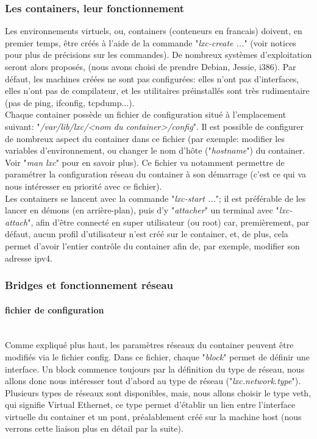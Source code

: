 
\subsubsection{Les containers, leur fonctionnement}

Les environnements virtuels, ou, containers (conteneurs en francais)  doivent, en premier temps, \^etre cr\'e\'es
\`a l'aide de la commande "\emph{lxc-create ...}" (voir notices pour plus de pr\'ecisions sur les commandes). De
nombreux syst\`emes d'exploitation seront alors propos\'es, (nous avons choisi de prendre Debian, Jessie,
i386). Par d\'efaut, les machines cr\'e\'ees ne sont pas configur\'ees: elles n'ont pas d'interfaces, elles 
n'ont pas de compilateur, et les utilitaires pr\'einstall\'es sont tr\`es rudimentaire 
(pas de ping, ifconfig, tcpdump...).\\

Chaque container poss\`ede un fichier de configuration situ\'e \`a l'emplacement suivant: "\emph{/var/lib/lxc/<nom 
du container>/config}". Il est possible de configurer de nombreux aspect du container dans ce fichier 
(par exemple: modifier les variables d'environnement, ou changer le nom d'h\^ote ("\emph{hostname}") du 
container. Voir "\emph{man lxc}" pour en savoir plus). Ce fichier va notamment permettre de param\'etrer la 
configuration r\'eseau du container \`a son d\'emarrage (c'est ce qui va nous int\'eresser en priorit\'e avec 
ce fichier).\\

Les containers se lancent avec la commande "\emph{lxc-start ...}"; il est pr\'ef\'erable de les lancer en d\'emons
(en arri\`ere-plan), puis d'y "\emph{attacher}" un terminal avec "\emph{lxc-attach}", afin d'\^etre connect\'e
en super utilisateur (ou root) car, premi\`erement, par d\'efaut, aucun profil d'utilisateur n'est cr\'e\'e sur 
le container, et, de plus, cela permet d'avoir l'entier contr\^ole du container afin de, par exemple, modifier 
son adresse ipv4.\\


\subsubsection{Bridges et fonctionnement r\'eseau}
\paragraph{fichier de configuration}~\\

Comme expliqu\'e plus haut, les param\`etres r\'eseaux du container peuvent \^etre modifi\'es via le fichier config.
Dans ce fichier, chaque "\emph{block}" permet de d\'efinir une interface. Un block commence toujours par la 
d\'efinition du type de r\'eseau, nous allons donc nous int\'eresser tout d'abord au type de r\'eseau
("\emph{lxc.network.type}").
Plusieurs types de r\'eseaux sont disponibles, mais, nous allons choisir le type veth, qui signifie Virtual 
Ethernet, ce type permet d'\'etablir un lien entre l'interface virtuelle du container et un pont, pr\'ealablement
cr\'e\'e sur la machine host (nous verrons cette liaison plus en d\'etail par la suite).\\

